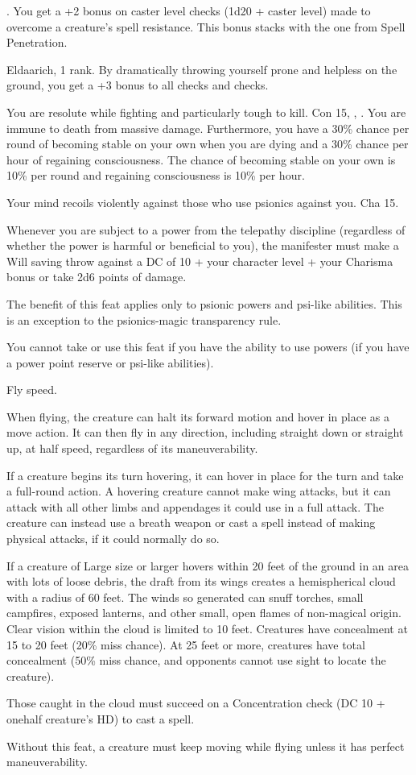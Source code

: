 {.}
{You get a +2 bonus on caster level checks (1d20 + caster level) made to overcome a creature's spell resistance. This bonus stacks with the one from Spell Penetration.}

{Eldaarich,  1 rank.}
{By dramatically throwing yourself prone and helpless on the ground, you get a +3 bonus to all  checks and  checks.}

{You are resolute while fighting and particularly tough to kill.}
{Con 15, , .}
{You are immune to death from massive damage. Furthermore, you have a 30\% chance per round of becoming stable on your own when you are dying and a 30\% chance per hour of regaining consciousness.}
{The chance of becoming stable on your own is 10\% per round and regaining consciousness is 10\% per hour.}{}

{Your mind recoils violently against those who use psionics against you.}
{Cha 15.}
{Whenever you are subject to a power from the telepathy discipline (regardless of whether the power is harmful or beneficial to you), the manifester must make a Will saving throw against a DC of 10 + \onehalf your character level + your Charisma bonus or take 2d6 points of damage.

The benefit of this feat applies only to psionic powers and psi-like abilities. This is an exception to the psionics-magic transparency rule.}{}
{You cannot take or use this feat if you have the ability to use powers (if you have a power point reserve or psi-like abilities).}

{}
{Fly speed.}
{When flying, the creature can halt its forward motion and hover in place as a move action. It can then fly in any direction, including straight down or straight up, at half speed, regardless of its maneuverability.

If a creature begins its turn hovering, it can hover in place for the turn and take a full-round action. A hovering creature cannot make wing attacks, but it can attack with all other limbs and appendages it could use in a full attack. The creature can instead use a breath weapon or cast a spell instead of making physical attacks, if it could normally do so.

If a creature of Large size or larger hovers within 20 feet of the ground in an area with lots of loose debris, the draft from its wings creates a hemispherical cloud with a radius of 60 feet. The winds so generated can snuff torches, small campfires, exposed lanterns, and other small, open flames of non-magical origin. Clear vision within the cloud is limited to 10 feet. Creatures have concealment at 15 to 20 feet (20\% miss chance). At 25 feet or more, creatures have total concealment (50\% miss chance, and opponents cannot use sight to locate the creature).

Those caught in the cloud must succeed on a Concentration check (DC 10 + onehalf creature's HD) to cast a spell.}
{Without this feat, a creature must keep moving while flying unless it has perfect maneuverability.}
{}

